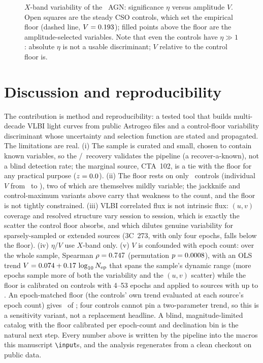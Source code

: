 \documentclass[twocolumn]{aastex631}
\newcommand{\code}[1]{\texttt{#1}}
\begin{document}


\begin{figure}
\caption{$X$-band variability of the \viTestable\ AGN: significance $\eta$ versus amplitude $V$. Open
squares are the steady CSO controls, which set the empirical floor (dashed line, $V=0.193$); filled
points above the floor are the amplitude-selected variables. Note that even the controls have $\eta\gg1$:
absolute $\eta$ is not a usable discriminant; $V$ relative to the control floor is.}
\label{fig:etav}
\end{figure}

\section{Discussion and reproducibility}
The contribution is method and reproducibility: a tested tool that builds multi-decade VLBI light curves
from public Astrogeo files and a control-floor variability discriminant whose uncertainty and
selection function are stated and propagated. The limitations are real. (i) The sample is curated and
small, chosen to contain known variables, so the \viNabove/\viNnoncontrol\ recovery validates the
pipeline (a recover-a-known), not a blind detection rate; the marginal source, CTA~102, is a tie
with the floor for any practical purpose ($z=0.0$). (ii) The floor rests on only \viNctrl\
controls (individual $V$ from \viCtrlVmin\ to \viCtrlVmax), two of which are themselves mildly
variable; the jackknife and control-maximum variants above carry that weakness to the count, and the
floor is not tightly constrained. (iii) VLBI correlated flux
is not intrinsic flux: $(u,v)$ coverage and resolved structure vary session to session, which is exactly
the scatter the control floor absorbs, and which dilutes genuine variability for sparsely-sampled or
extended sources (3C~273, with only four epochs, falls below the floor). (iv) $\eta$/$V$ use $X$-band
only. (v) $V$ is confounded with epoch count: over the whole sample, Spearman
$\rho=0.747$ (permutation $p=0.0008$), with an OLS trend
$V=0.074+0.17\,\log_{10}N_{\rm ep}$ that spans the sample's dynamic range (more epochs sample more of both the variability and the $(u,v)$ scatter) while the floor is calibrated on
controls with 4--53 epochs and applied to sources with up to \viTopEpochs. An epoch-matched floor
(the controls' own trend evaluated at each source's epoch count) gives \viNaboveEpochMatched\ of
\viNnoncontrol; four controls cannot pin a two-parameter trend, so this is a sensitivity variant,
not a replacement headline. A blind, magnitude-limited catalog with the floor calibrated per
epoch-count and declination bin is the natural next step. Every number above is written by the pipeline into the macros this manuscript
\code{\textbackslash input}s, and the analysis regenerates from a clean checkout on public data.
\end{document}
